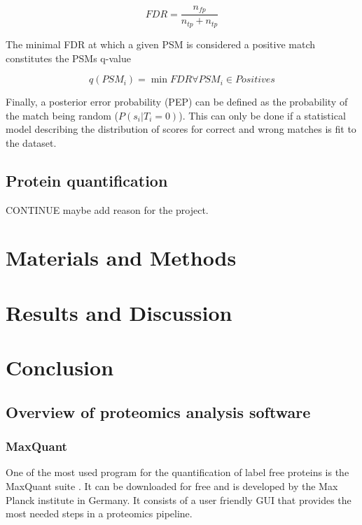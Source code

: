 \documentclass[11pt, a4paper]{report}
\begin{document}
$$FDR = \frac{n_{fp}}{n_{tp} + n_{tp}}$$

The minimal FDR at which a given PSM is considered a positive match constitutes the PSM\textquotesingle s q-value

$$ q(PSM_i) = \min FDR \forall PSM_i \in Positives$$

Finally, a posterior error probability (PEP) can be defined as the probability of the match being random ($P(s_i | T_i = 0)$). This can only be done if a statistical model describing the distribution of scores for correct and wrong matches is fit to the dataset.


\section{Protein quantification}




CONTINUE maybe add reason for the project.

\chapter{Materials and Methods}

\chapter{Results and Discussion}

\chapter{Conclusion}








\section{Overview of proteomics analysis software}

\subsection{MaxQuant}

One of the most used program for the quantification of label free proteins is the MaxQuant suite \cite{Cox2008}. It can be downloaded for free and is developed by the Max Planck institute in Germany. It consists of a user friendly GUI that provides the most needed steps in a proteomics pipeline.
\end{document}
